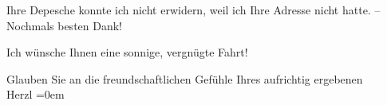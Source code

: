 \pstart
           Ihre Depesche konnte ich nicht erwidern, weil ich Ihre Adresse nicht hatte. –
               Nochmals besten Dank! \pend
           
\pstart
           Ich wünsche Ihnen eine sonnige, vergnügte Fahrt!\pend
           
\pstart
           Glauben Sie an die freundschaftlichen Gefühle Ihres aufrichtig ergebenen{\\[\baselineskip]}\spacefill\mbox{Herzl}\pend
           \leftskip=0em{}\endnumbering{}
\begin{anhang}
\end{anhang}
      